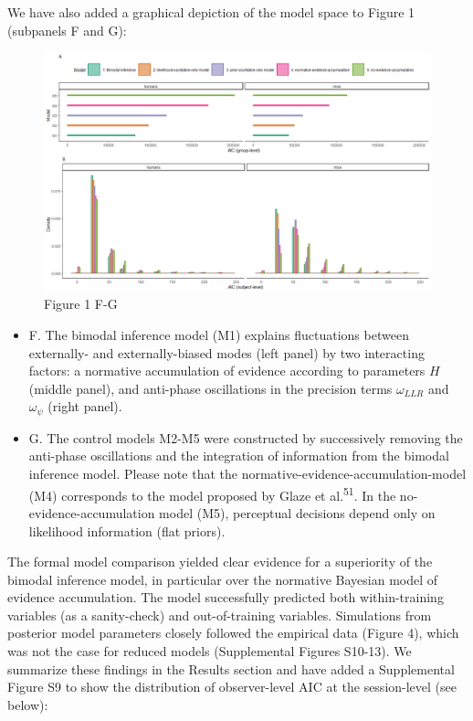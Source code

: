 \documentclass[
]{article}
\begin{document}
We have also added a graphical depiction of the model space to Figure 1
(subpanels F and G):

\begin{figure}
\centering
\includegraphics{./Material/model_space.png}
\caption{Figure 1 F-G}
\end{figure}

\begin{itemize}
\item
  F. The bimodal inference model (M1) explains fluctuations between
  externally- and externally-biased modes (left panel) by two
  interacting factors: a normative accumulation of evidence according to
  parameters \(H\) (middle panel), and anti-phase oscillations in the
  precision terms \(\omega_{LLR}\) and \(\omega_{\psi}\) (right panel).
\item
  G. The control models M2-M5 were constructed by successively removing
  the anti-phase oscillations and the integration of information from
  the bimodal inference model. Please note that the
  normative-evidence-accumulation-model (M4) corresponds to the model
  proposed by Glaze et al.\textsuperscript{51}. In the
  no-evidence-accumulation model (M5), perceptual decisions depend only
  on likelihood information (flat priors).
\end{itemize}

The formal model comparison yielded clear evidence for a superiority of
the bimodal inference model, in particular over the normative Bayesian
model of evidence accumulation. The model successfully predicted both
within-training variables (as a sanity-check) and out-of-training
variables. Simulations from posterior model parameters closely followed
the empirical data (Figure 4), which was not the case for reduced models
(Supplemental Figures S10-13). We summarize these findings in the
Results section and have added a Supplemental Figure S9 to show the
distribution of observer-level AIC at the session-level (see below):
\end{document}
